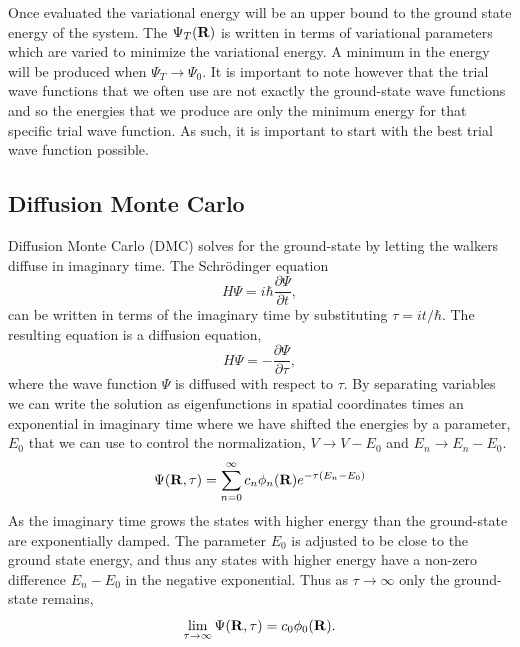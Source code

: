 Once evaluated the variational energy will be an upper bound to the ground state energy of the system. The $\Psi_T(\mathbf{R})$ is written in terms of variational parameters which are varied to minimize the variational energy. A minimum in the energy will be produced when $\Psi_T \rightarrow \Psi_0$. It is important to note however that the trial wave functions that we often use are not exactly the ground-state wave functions and so the energies that we produce are only the minimum energy for that specific trial wave function. As such, it is important to start with the best trial wave function possible.

\subsection{Diffusion Monte Carlo}
Diffusion Monte Carlo (DMC) solves for the ground-state by letting the walkers diffuse in imaginary time. The Schr\"odinger equation
\begin{equation}
   H\Psi = i\hbar\frac{\partial\Psi}{\partial t},
\end{equation}
can be written in terms of the imaginary time by substituting $\tau=it/\hbar$. The resulting equation is a diffusion equation,
\begin{equation}
   H\Psi = -\frac{\partial\Psi}{\partial\tau},
   \label{equ:diffusion}
\end{equation}
where the wave function $\Psi$ is diffused with respect to $\tau$. By separating variables we can write the solution as eigenfunctions in spatial coordinates times an exponential in imaginary time where we have shifted the energies by a parameter, $E_0$ that we can use to control the normalization, $V\rightarrow V - E_0$ and $E_n \rightarrow E_n-E_0$.
\begin{equation}
   \Psi(\mathbf{R},\tau) = \sum\limits_{n=0}^\infty c_n\phi_n(\mathbf{R})e^{-\tau(E_n-E_0)}
\end{equation}
As the imaginary time grows the states with higher energy than the ground-state are exponentially damped. The parameter $E_0$ is adjusted to be close to the ground state energy, and thus any states with higher energy have a non-zero difference $E_n-E_0$ in the negative exponential. Thus as $\tau\rightarrow\infty$ only the ground-state remains,
\begin{equation}
   \lim\limits_{\tau\rightarrow\infty}\Psi(\mathbf{R},\tau) = c_0\phi_0(\mathbf{R}).
\end{equation}


